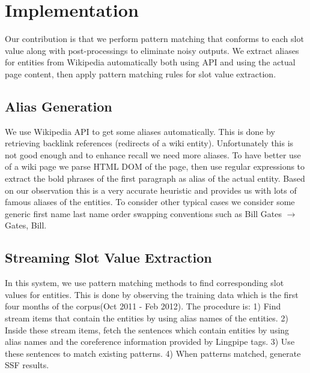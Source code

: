 

\section{Implementation}
\label{section:implementation}

Our contribution is that we perform pattern matching that conforms to each slot 
value along with post-processings to eliminate noisy outputs. We extract aliases for entities from Wikipedia automatically both using API 
and using the actual page content, then apply pattern matching rules for slot 
value extraction. 


\subsection{Alias Generation}

We use Wikipedia API to get some aliases automatically. This is done by 
retrieving backlink references (redirects of a wiki entity). Unfortunately 
this is not good enough and to enhance recall we need more aliases. To have 
better use of a wiki page we parse HTML DOM of the page, then use regular 
expressions to extract the bold phrases of the first paragraph as alias of the 
actual entity. Based on our observation this is a very accurate heuristic and 
provides us with lots of famous aliases of the entities. To consider other 
typical cases we consider some generic first name last name order swapping 
conventions such as Bill Gates $\rightarrow$ Gates, Bill.  

\subsection{Streaming Slot Value Extraction}

In this system, we use pattern matching methods to find corresponding slot 
values for entities. This is done by observing the training data which is the first four months of the corpus(Oct 2011 - Feb 2012). The procedure is: 1) Find stream items that contain the 
entities by using alias names of the entities. 2) Inside these stream items, 
fetch the sentences which contain entities by using alias names and the 
coreference information provided by Lingpipe tags. 3) Use these sentences to 
match existing patterns. 4) When patterns matched, generate SSF results.

